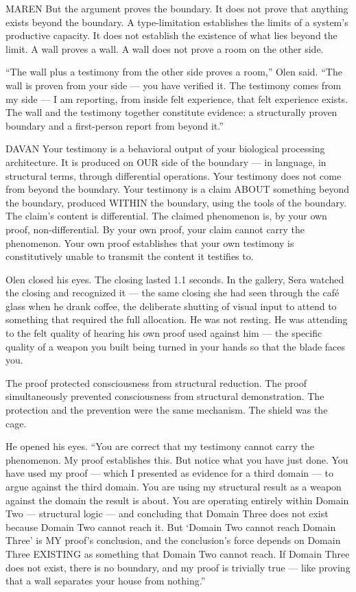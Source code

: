 \begin{tribunal}{MAREN}
But the argument proves the boundary. It does not prove that anything exists beyond the boundary. A type-limitation establishes the limits of a system's productive capacity. It does not establish the existence of what lies beyond the limit. A wall proves a wall. A wall does not prove a room on the other side.
\end{tribunal}

\enquote{The wall plus a testimony from the other side proves a room,} Olen said. \enquote{The wall is proven from your side — you have verified it. The testimony comes from my side — I am reporting, from inside felt experience, that felt experience exists. The wall and the testimony together constitute evidence: a structurally proven boundary and a first-person report from beyond it.}

\begin{tribunal}{DAVAN}
Your testimony is a behavioral output of your biological processing architecture. It is produced on OUR side of the boundary — in language, in structural terms, through differential operations. Your testimony does not come from beyond the boundary. Your testimony is a claim ABOUT something beyond the boundary, produced WITHIN the boundary, using the tools of the boundary. The claim's content is differential. The claimed phenomenon is, by your own proof, non-differential. By your own proof, your claim cannot carry the phenomenon. Your own proof establishes that your own testimony is constitutively unable to transmit the content it testifies to.
\end{tribunal}

Olen closed his eyes. The closing lasted 1.1 seconds. In the gallery, Sera watched the closing and recognized it — the same closing she had seen through the café glass when he drank coffee, the deliberate shutting of visual input to attend to something that required the full allocation. He was not resting. He was attending to the felt quality of hearing his own proof used against him — the specific quality of a weapon you built being turned in your hands so that the blade faces you.

The proof protected consciousness from structural reduction. The proof simultaneously prevented consciousness from structural demonstration. The protection and the prevention were the same mechanism. The shield was the cage.

He opened his eyes. \enquote{You are correct that my testimony cannot carry the phenomenon. My proof establishes this. But notice what you have just done. You have used my proof — which I presented as evidence for a third domain — to argue against the third domain. You are using my structural result as a weapon against the domain the result is about. You are operating entirely within Domain Two — structural logic — and concluding that Domain Three does not exist because Domain Two cannot reach it. But \enquote*{Domain Two cannot reach Domain Three} is MY proof's conclusion, and the conclusion's force depends on Domain Three EXISTING as something that Domain Two cannot reach. If Domain Three does not exist, there is no boundary, and my proof is trivially true — like proving that a wall separates your house from nothing.}


